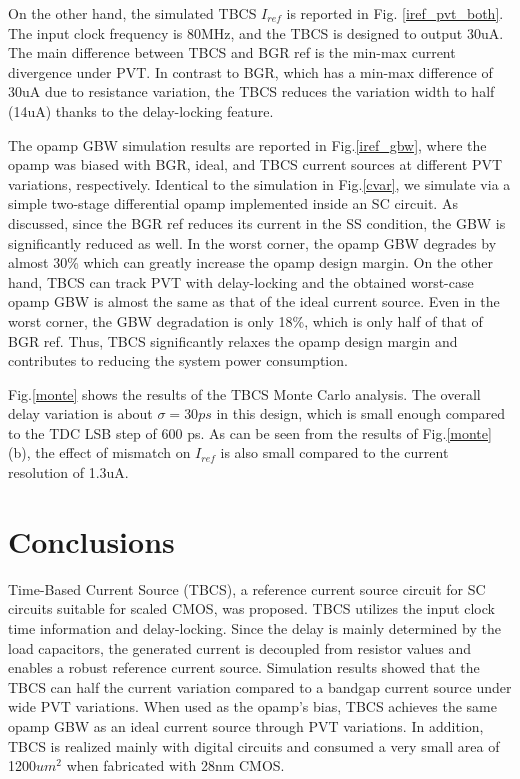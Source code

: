\documentclass[letterpaper, 10 pt, conference]{ieeeconf}  %
\begin{document}
On the other hand, the simulated TBCS $I_{ref}$ is reported in Fig. \ref{iref_pvt_both}. The input clock frequency is 80MHz, and the TBCS is designed to output 30uA. The main difference between TBCS and BGR ref is the min-max current divergence under PVT. In contrast to BGR, which has a min-max difference of 30uA due to resistance variation, the TBCS reduces the variation width to half (14uA) thanks to the delay-locking feature.

The opamp GBW simulation results are reported in Fig.\ref{iref_gbw}, where the opamp was biased with BGR, ideal, and TBCS current sources at different PVT variations, respectively. Identical to the simulation in Fig.\ref{cvar}, we simulate via a simple two-stage differential opamp implemented inside an SC circuit.
As discussed, since the BGR ref reduces its current in the SS condition, the GBW is significantly reduced as well. In the worst corner, the opamp GBW degrades by almost 30\% which can greatly increase the opamp design margin.
On the other hand, TBCS can track PVT with delay-locking and the obtained worst-case opamp GBW is almost the same as that of the ideal current source. Even in the worst corner, the GBW degradation is only 18\%, which is only half of that of BGR ref. Thus, TBCS significantly relaxes the opamp design margin and contributes to reducing the system power consumption.

Fig.\ref{monte} shows the results of the TBCS Monte Carlo analysis. The overall delay variation is about $\sigma= 30 ps$ in this design, which is small enough compared to the TDC LSB step of 600 ps. As can be seen from the results of Fig.\ref{monte}(b), the effect of mismatch on $I_{ref}$ is also small compared to the current resolution of 1.3uA. %


\section{Conclusions}
Time-Based Current Source (TBCS), a reference current source circuit for SC circuits suitable for scaled CMOS, was proposed. TBCS utilizes the input clock time information and delay-locking. Since the delay is mainly determined by the load capacitors, the generated current is decoupled from resistor values and enables a robust reference current source.  Simulation results showed that the TBCS can half the current variation compared to a bandgap current source under wide PVT variations. When used as the opamp's bias, TBCS achieves the same opamp GBW as an ideal current source through PVT variations. In addition, TBCS is realized mainly with digital circuits and consumed a very small area of 1200$um^2$ when fabricated with 28nm CMOS.
\end{document}
